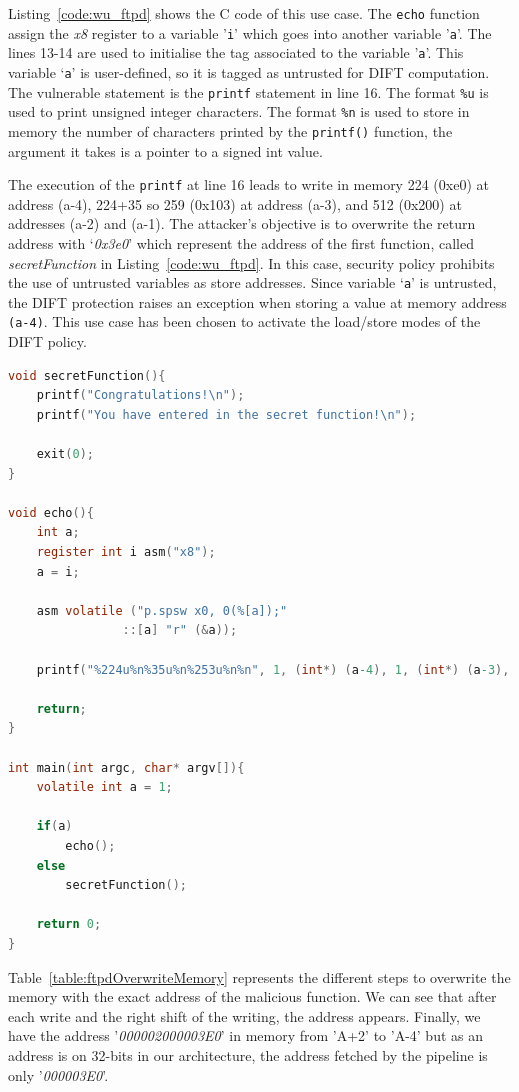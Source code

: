 Listing~\ref{code:wu_ftpd} shows the C code of this use case. The \texttt{echo} function assign the \textit{x8} register to a variable '\verb|i|' which goes into another variable '\verb|a|'.
The lines 13-14 are used to initialise the tag associated to the variable '\verb|a|'. This variable `\verb|a|' is user-defined, so it is tagged as untrusted for DIFT computation.
The vulnerable statement is the \verb|printf| statement in line 16.
The format \verb|%u| is used to print unsigned integer characters.
The format \verb|%n| is used to store in memory the number of characters printed by the \verb|printf()| function, the argument it takes is a pointer to a signed int value. 

The execution of the \verb|printf| at line 16 leads to write in memory 224 (0xe0) at address (a-4), 224+35 so 259 (0x103) at address (a-3), and 512 (0x200) at addresses (a-2) and (a-1). The attacker's objective is to overwrite the return address with `\textit{0x3e0}' which represent the address of the first function, called \textit{secretFunction} in Listing~\ref{code:wu_ftpd}. In this case, security policy prohibits the use of untrusted variables as store addresses. Since variable `\verb|a|' is untrusted, the DIFT protection raises an exception when storing a value at memory address \verb|(a-4)|. This use case has been chosen to activate the load/store modes of the DIFT policy. 

\begin{lstlisting}[style=topPosition, language=C,label=code:wu_ftpd, caption=WU-FTPd C code]
void secretFunction(){
    printf("Congratulations!\n");
    printf("You have entered in the secret function!\n");

    exit(0);
}

void echo(){
    int a;
    register int i asm("x8");
    a = i;

    asm volatile ("p.spsw x0, 0(%[a]);"                
                ::[a] "r" (&a));

    printf("%224u%n%35u%n%253u%n%n", 1, (int*) (a-4), 1, (int*) (a-3), 1, (int*) (a-2), (int*) (a-1));

    return;
}

int main(int argc, char* argv[]){ 
    volatile int a = 1;

    if(a)
        echo();
    else
        secretFunction();

    return 0;
}\end{lstlisting}

Table~\ref{table:ftpdOverwriteMemory} represents the different steps to overwrite the memory with the exact address of the malicious function. We can see that after each write and the right shift of the writing, the address appears. Finally, we have the address '\textit{000002000003E0}' in memory from 'A+2' to 'A-4' but as an address is on 32-bits in our architecture, the address fetched by the pipeline is only '\textit{000003E0}'.

